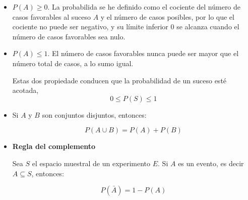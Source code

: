 \begin{tcolorbox}[colback=blue!5!white,colframe=blue!60!black,title=Axiomas de la probabilidad]

\begin{itemize}
\item $P(A) \geq 0$. La probabilida se he definido como el cociente del número
de casos favorables al suceso $A$ y el número de casos posibles, por lo que el
cociente no puede ser negativo, y su límite inferior 0 se alcanza cuando el
número de casos favorables sea nulo.

\item $P(A) \leq 1$. El número de casos favorables nunca puede ser mayor que el
número total de casos, a lo sumo igual.


Estas dos propiedade conducen  que la probabilidad de un suceso esté acotada, 
\begin{equation}
    0 \leq P(S) \leq 1
    \label{eq:acotadaProb}
\end{equation}

\item Si $A$ y $B$ son conjuntos disjuntos, entonces:

\begin{equation}
    P(A \cup B) = P(A) + P(B)
    \label{eq:probaAunionB}
\end{equation}

\item \textbf{Regla del complemento}

Sea $S$ el espacio muestral de un experimento $E$. Si $A$ es un evento, es decir
$A \subseteq S$, entonces:

\begin{equation}
    P(\bar{A}) = 1 - P(A)
    \label{eq:complementRule}
\end{equation}

\end{itemize}
\end{tcolorbox}
